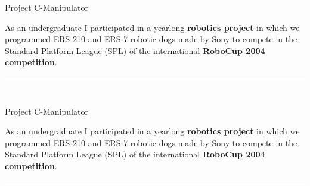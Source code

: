 


\begin{frame}{Project C-Manipulator }

\justifying

As an undergraduate I participated in a yearlong {\bf robotics project} in which
we programmed ERS-210 and ERS-7 robotic dogs made by Sony to compete in the 
Standard Platform League (SPL) of the international {\bf RoboCup 2004 competition}.

\vspace{2em}


\vspace{1em}

\begin{center}
\rule{2cm}{0.4pt}\\[0.5em]
\end{center}

\end{frame}


\begin{frame}{Project C-Manipulator }

\justifying

As an undergraduate I participated in a yearlong {\bf robotics project} in which
we programmed ERS-210 and ERS-7 robotic dogs made by Sony to compete in the 
Standard Platform League (SPL) of the international {\bf RoboCup 2004 competition}.

\vspace{2em}


\vspace{1em}

\begin{center}
\rule{2cm}{0.4pt}\\[0.5em]
\end{center}

\end{frame}

